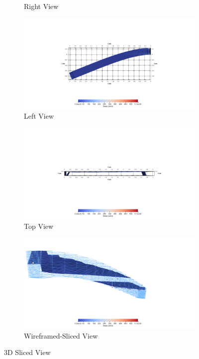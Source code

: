 \documentclass[a4paper,11pt]{article}
\begin{document}
\begin{figure}[h!]
\begin{subfigure}[b]{0.5\linewidth}
		\caption{Right View}
	\end{subfigure}
	\quad
	\begin{subfigure}[b]{0.5\linewidth}
		\centering
		\includegraphics[width=\linewidth]{picture/conference/3dslice7}
		\caption{Left View}
	\end{subfigure}
	\quad
	\begin{subfigure}[b]{0.5\linewidth}
		\centering
		\includegraphics[width=\linewidth]{picture/conference/3dslice8}
		\caption{Top View}
	\end{subfigure}
	\quad
	\begin{subfigure}[b]{0.5\linewidth}
		\centering
		\includegraphics[width=\linewidth]{picture/conference/3dslice9}
		\caption{Wireframed-Sliced View}
	\end{subfigure}
	\caption{3D Sliced View}
	\label{fig:3dsliceview}
\end{figure}
\end{document}
